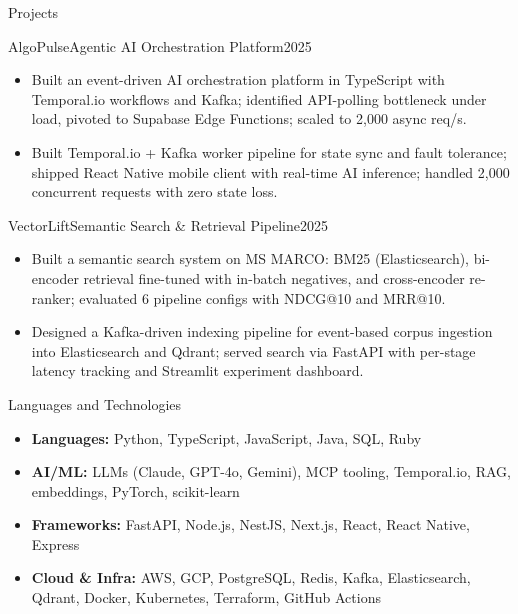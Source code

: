 \documentclass[]{mcdowellcv}
\begin{document}
\begin{cvsection}{Projects}
  \begin{cvsubsection}{AlgoPulse}{Agentic AI Orchestration Platform}{2025}
    \begin{itemize}
      \item Built an event-driven AI orchestration platform in TypeScript with Temporal.io workflows and Kafka; identified API-polling bottleneck under load, pivoted to Supabase Edge Functions; scaled to 2,000 async req/s.
      \item Built Temporal.io + Kafka worker pipeline for state sync and fault tolerance; shipped React Native mobile client with real-time AI inference; handled 2,000 concurrent requests with zero state loss.
    \end{itemize}
    \vspace{-1.5pt}
  \end{cvsubsection}

  \begin{cvsubsection}{VectorLift}{Semantic Search \& Retrieval Pipeline}{2025}
    \begin{itemize}
      \item Built a semantic search system on MS MARCO: BM25 (Elasticsearch), bi-encoder retrieval fine-tuned with in-batch negatives, and cross-encoder re-ranker; evaluated 6 pipeline configs with NDCG@10 and MRR@10.
      \item Designed a Kafka-driven indexing pipeline for event-based corpus ingestion into Elasticsearch and Qdrant; served search via FastAPI with per-stage latency tracking and Streamlit experiment dashboard.
    \end{itemize}
    \vspace{-1.5pt}
  \end{cvsubsection}
\end{cvsection}

\begin{cvsection}{Languages and Technologies}
  \begin{cvsubsection}{}{}{}
    \begin{itemize}
      \item \textbf{Languages:} Python, TypeScript, JavaScript, Java, SQL, Ruby
      \item \textbf{AI/ML:} LLMs (Claude, GPT-4o, Gemini), MCP tooling, Temporal.io, RAG, embeddings, PyTorch, scikit-learn
      \item \textbf{Frameworks:} FastAPI, Node.js, NestJS, Next.js, React, React Native, Express
      \item \textbf{Cloud \& Infra:} AWS, GCP, PostgreSQL, Redis, Kafka, Elasticsearch, Qdrant, Docker, Kubernetes, Terraform, GitHub Actions
    \end{itemize}
  \end{cvsubsection}
\end{cvsection}
\end{document}
